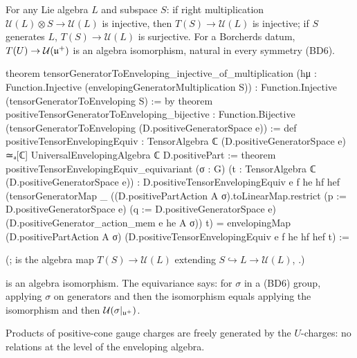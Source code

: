 \begin{theorem}\label{ch18:thm:tensor}
For any Lie algebra $L$ and subspace $S$: if right multiplication $\mathcal U(L)\otimes S\to \mathcal U(L)$ is injective, then $T(S)\to \mathcal U(L)$ is injective;
if $S$ generates $L$, $T(S)\to \mathcal U(L)$ is surjective.  For a Borcherds datum, $T(U)\to \mathcal U(\mathfrak{u}^+)$ is an algebra isomorphism, natural in
every symmetry (BD6).
\end{theorem}
\begin{leancode}
theorem tensorGeneratorToEnveloping_injective_of_multiplication
    (hμ : Function.Injective (envelopingGeneratorMultiplication S)) :
    Function.Injective (tensorGeneratorToEnveloping S) := by
theorem positiveTensorGeneratorToEnveloping_bijective :
    Function.Bijective (tensorGeneratorToEnveloping (D.positiveGeneratorSpace e)) :=
def positiveTensorEnvelopingEquiv :
    TensorAlgebra ℂ (D.positiveGeneratorSpace e) ≃ₐ[ℂ]
      UniversalEnvelopingAlgebra ℂ D.positivePart :=
theorem positiveTensorEnvelopingEquiv_equivariant (σ : G)
    (t : TensorAlgebra ℂ (D.positiveGeneratorSpace e)) :
    D.positiveTensorEnvelopingEquiv e f he hf hef
        (tensorGeneratorMap _ ((D.positivePartAction A σ).toLinearMap.restrict
          (p := D.positiveGeneratorSpace e) (q := D.positiveGeneratorSpace e)
          (D.positiveGenerator_action_mem e he A σ)) t) =
      envelopingMap (D.positivePartAction A σ)
        (D.positiveTensorEnvelopingEquiv e f he hf hef t) :=
\end{leancode}
(;  is the algebra map
$T(S)\to \mathcal U(L)$ extending $S\hookrightarrow L\to \mathcal U(L)$, .)
\begin{dictionary}
 is an algebra isomorphism.  The equivariance says: for $\sigma$ in a (BD6) group, applying $\sigma$ on generators and then the
isomorphism equals applying the isomorphism and then $\mathcal U(\sigma|_{\mathfrak{u}^+})$.
\end{dictionary}
\begin{physics}Products of positive-cone gauge charges are freely generated by the $U$-charges: no relations at the level of the enveloping algebra.\end{physics}
